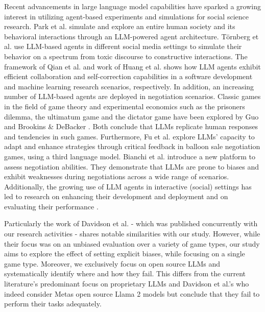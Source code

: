 \documentclass[runningheads]{llncs}
\begin{document}
Recent advancements in large language model capabilities have sparked a growing interest in utilizing agent-based experiments and simulations for social science research. Park et al. \cite{park_generative_2023} simulate and explore an entire human society and its behavioral interactions through an LLM-powered agent architecture. Törnberg et al. \cite{tornberg_simulating_2023} use LLM-based agents in different social media settings to simulate their behavior on a spectrum from toxic discourse to constructive interactions. The framework of Qian et al. \cite{qian_communicative_2023} and work of Huang et al. \cite{huang_benchmarking_2023} shows how LLM agents exhibit efficient collaboration and self-correction capabilities in a software development and machine learning research scenarios, respectively. In addition, an increasing number of LLM-based agents are deployed in negotiation scenarios. Classic games in the field of game theory and experimental economics such as the prisoners dilemma, the ultimatum game and the dictator game have been explored by Guo \cite{guo_gpt_2023} and Brookins \& DeBacker \cite{brookins_playing_2023}. Both conclude that LLMs replicate human responses and tendencies in such games. Furthermore, Fu et al. \cite{fu_improving_2023} explore LLMs' capacity to adapt and enhance strategies through critical feedback in balloon sale negotiation games, using a third language model. Bianchi et al. \cite{bianchi_how_2024} introduce a new platform to assess negotiation abilities. They demonstrate that LLMs are prone to biases and exhibit weaknesses during negotiations across a wide range of scenarios. Additionally, the growing use of LLM agents in interactive (social) settings has led to research on enhancing their development and deployment \cite{chase_langchain_2022,wu_autogen_2023,moura_joaomdmouracrewai_2024,liu_agentlite_2024} and on evaluating their performance \cite{wang_rolellm_2023,liu_agentbench_2023,davidson_evaluating_2024}.

Particularly the work of Davidson et al. \cite{davidson_evaluating_2024} - which was published concurrently with our research activities - shares notable similarities with our study. However, while their focus was on an unbiased evaluation over a variety of game types, our study aims to explore the effect of setting explicit biases, while focusing on a single game type. Moreover, we exclusively focus on open source LLMs and systematically identify where and how they fail. This differs from the current literature's predominant focus on proprietary LLMs and Davidson et al.'s who indeed consider Metas open source Llama 2 models \cite{touvron_llama_2023} but conclude that they fail to perform their tasks adequately.
\end{document}
